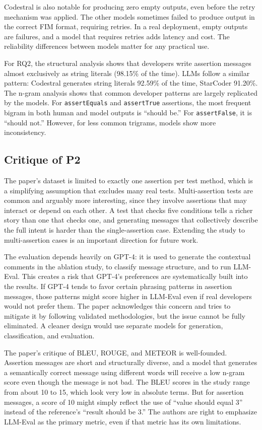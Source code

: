 \documentclass[
    pdftex,
    final,
    11pt,
    a4paper,
    parskip=false,
    oneside,
    footheight=0mm,
    footinclude=false,
    toc=bibliography
]{scrbook}
\begin{document}
Codestral is also notable for producing zero empty outputs, even before the retry mechanism was applied. The other models sometimes failed to produce output in the correct FIM format, requiring retries. In a real deployment, empty outputs are failures, and a model that requires retries adds latency and cost. The reliability differences between models matter for any practical use.

For RQ2, the structural analysis shows that developers write assertion messages almost exclusively as string literals (98.15\% of the time). LLMs follow a similar pattern: Codestral generates string literals 92.59\% of the time, StarCoder 91.20\%. The n-gram analysis shows that common developer patterns are largely replicated by the models. For \texttt{assertEquals} and \texttt{assertTrue} assertions, the most frequent bigram in both human and model outputs is ``should be.'' For \texttt{assertFalse}, it is ``should not.'' However, for less common trigrams, models show more inconsistency.

\subsection{Critique of P2}

The paper's dataset is limited to exactly one assertion per test method, which is a simplifying assumption that excludes many real tests. Multi-assertion tests are common and arguably more interesting, since they involve assertions that may interact or depend on each other. A test that checks five conditions tells a richer story than one that checks one, and generating messages that collectively describe the full intent is harder than the single-assertion case. Extending the study to multi-assertion cases is an important direction for future work.

The evaluation depends heavily on GPT-4: it is used to generate the contextual comments in the ablation study, to classify message structure, and to run LLM-Eval. This creates a risk that GPT-4's preferences are systematically built into the results. If GPT-4 tends to favor certain phrasing patterns in assertion messages, those patterns might score higher in LLM-Eval even if real developers would not prefer them. The paper acknowledges this concern and tries to mitigate it by following validated methodologies, but the issue cannot be fully eliminated. A cleaner design would use separate models for generation, classification, and evaluation.

The paper's critique of BLEU, ROUGE, and METEOR is well-founded. Assertion messages are short and structurally diverse, and a model that generates a semantically correct message using different words will receive a low n-gram score even though the message is not bad. The BLEU scores in the study range from about 10 to 15, which look very low in absolute terms. But for assertion messages, a score of 10 might simply reflect the use of ``value should equal 3'' instead of the reference's ``result should be 3.'' The authors are right to emphasize LLM-Eval as the primary metric, even if that metric has its own limitations.
\end{document}
